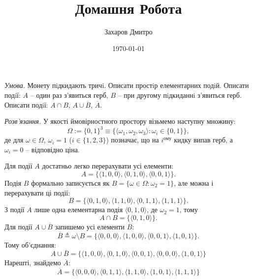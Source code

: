\documentclass[oneside,solution]{karazin-prob-theory-assign}
\title{Домашня Робота}
\author{Захаров Дмитро}
\date{\today}
\begin{document}
\maketitle



\hspace{20px}\textit{Умова.} Монету пiдкидають тричi. Описати простiр елементарних подiй. Описати подiї: $A$ -- один раз з’явиться герб, $B$ -- при другому пiдкиданнi
з’явиться герб. Описати подiї: $A \cap B$, $A \cup \overline{B}$, $\overline{A}$.

\textit{Розв'язання.} У якості ймовірностного простору візьмемо наступну множину:
\begin{equation}
    \Omega := \{0,1\}^3 \equiv \{\langle \omega_1,\omega_2,\omega_3 \rangle: \omega_i \in \{0,1\}\},
\end{equation}
де для $\omega \in \Omega$, $\omega_i = 1$ ($i \in \{1,2,3\}$) позначає, що на $i^{\text{ому}}$ кидку випав герб, а $\omega_i=0$ -- відповідно ціна. 

Для події $A$ достатньо легко перерахувати усі елементи:
\begin{equation}
    A = \{\langle 1,0,0\rangle,\langle 0,1,0\rangle,\langle 0,0,1\rangle\}.
\end{equation}
Подія $B$ формально записується як $B=\{\omega \in \Omega: \omega_2=1\}$, але можна і перерахувати ці події:
\begin{equation}
    B = \{\langle 0,1,0\rangle,\langle 1,1,0\rangle,\langle 0,1,1\rangle,\langle 1,1,1\rangle\}.
\end{equation}
З події $A$ лише одна елементарна подія $\langle 0,1,0\rangle$, де $\omega_2=1$, тому
\begin{equation}
    A \cap B = \{\langle 0,1,0\rangle\}.
\end{equation}
Для події $A \cup \overline{B}$ запишемо усі елементи $\overline{B}$:
\begin{equation}
    \overline{B} \triangleq \omega \setminus B = \{\langle 0,0,0\rangle,\langle 1,0,0\rangle,\langle 0,0,1\rangle,\langle 1,0,1\rangle\}.
\end{equation}
Тому об'єднання:
\begin{equation}
    A \cup \overline{B} = \{\langle 1,0,0\rangle,\langle 0,1,0\rangle,\langle 0,0,1\rangle,\langle 0,0,0\rangle,\langle 1,0,1\rangle\}
\end{equation}
Нарешті, знайдемо $\overline{A}$:
\begin{equation}
    \overline{A} = \{\langle 0,0,0\rangle,\langle 0,1,1\rangle,\langle 1,1,0\rangle,\langle 1,0,1\rangle,\langle 1,1,1\rangle\}
\end{equation}
\end{document}
